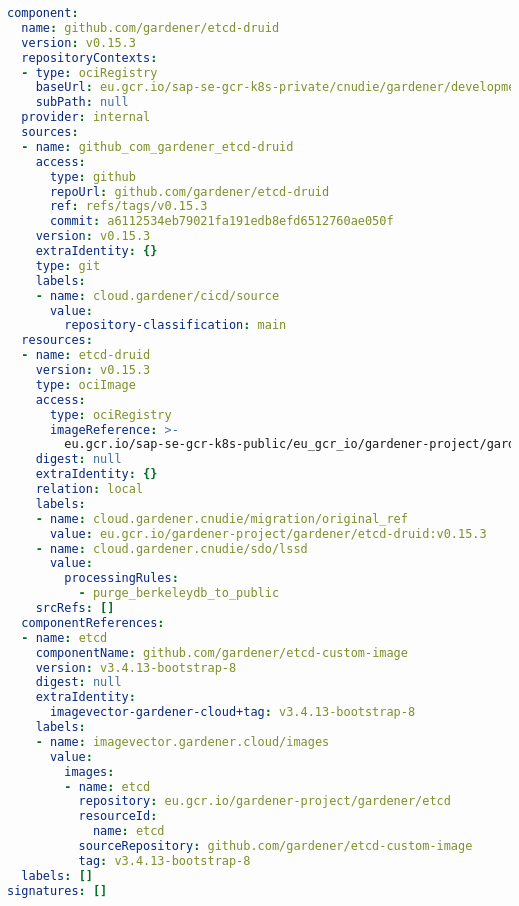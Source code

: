 \begin{lstlisting}[language=yaml, caption=Component Descriptor, captionpos=b, label=lst:ComponentDescriptor]
component:
  name: github.com/gardener/etcd-druid
  version: v0.15.3
  repositoryContexts:
  - type: ociRegistry
    baseUrl: eu.gcr.io/sap-se-gcr-k8s-private/cnudie/gardener/development
    subPath: null
  provider: internal
  sources:
  - name: github_com_gardener_etcd-druid
    access:
      type: github
      repoUrl: github.com/gardener/etcd-druid
      ref: refs/tags/v0.15.3
      commit: a6112534eb79021fa191edb8efd6512760ae050f
    version: v0.15.3
    extraIdentity: {}
    type: git
    labels:
    - name: cloud.gardener/cicd/source
      value:
        repository-classification: main
  resources:
  - name: etcd-druid
    version: v0.15.3
    type: ociImage
    access:
      type: ociRegistry
      imageReference: >-
        eu.gcr.io/sap-se-gcr-k8s-public/eu_gcr_io/gardener-project/gardener/etcd-druid:v0.15.3-mod1
    digest: null
    extraIdentity: {}
    relation: local
    labels:
    - name: cloud.gardener.cnudie/migration/original_ref
      value: eu.gcr.io/gardener-project/gardener/etcd-druid:v0.15.3
    - name: cloud.gardener.cnudie/sdo/lssd
      value:
        processingRules:
          - purge_berkeleydb_to_public
    srcRefs: []
  componentReferences:
  - name: etcd
    componentName: github.com/gardener/etcd-custom-image
    version: v3.4.13-bootstrap-8
    digest: null
    extraIdentity:
      imagevector-gardener-cloud+tag: v3.4.13-bootstrap-8
    labels:
    - name: imagevector.gardener.cloud/images
      value:
        images:
        - name: etcd
          repository: eu.gcr.io/gardener-project/gardener/etcd
          resourceId:
            name: etcd
          sourceRepository: github.com/gardener/etcd-custom-image
          tag: v3.4.13-bootstrap-8
  labels: []
signatures: []
\end{lstlisting}

